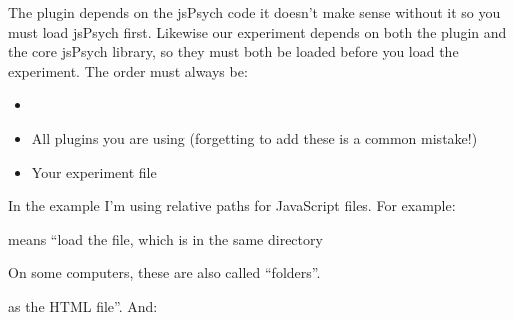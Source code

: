 \documentclass[letterpaper,10pt,english]{sphinxmanual}
\begin{document}
\begin{sphinxVerbatim}[commandchars=\\\{\}]
 
 
 
\end{sphinxVerbatim}

The plugin depends on the jsPsych code \textendash{} it doesn’t make sense without it \textendash{}
so you must load jsPsych first. Likewise our experiment depends on both the
plugin and the core jsPsych library, so they must both be loaded before you load
the experiment. The order must always be:
\begin{itemize}
\item {} 

\item {} 
All plugins you are using (forgetting to add these is a common mistake!)

\item {} 
Your experiment file

\end{itemize}

In the example I’m using relative paths for JavaScript files. For example:

\begin{sphinxVerbatim}[commandchars=\\\{\}]
 
\end{sphinxVerbatim}

means “load the  file, which is in the same directory %
\begin{footnote}[1]\sphinxAtStartFootnote
On some computers, these are also called “folders”.
%
\end{footnote}
as the HTML file”. And:
\end{document}
